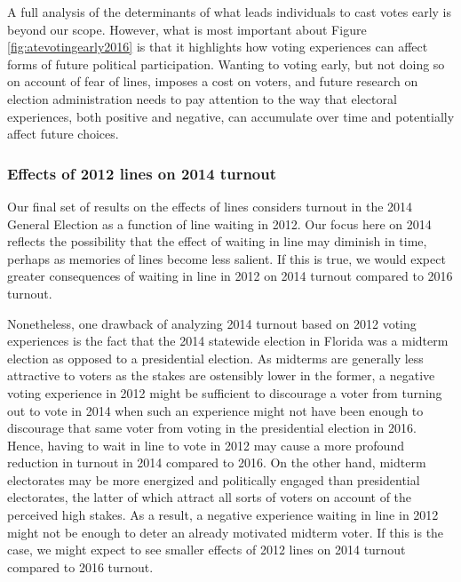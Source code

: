 \documentclass[12pt,titlepage]{article}
\begin{document}

A full analysis of the determinants of what leads individuals to cast
votes early is beyond our scope.  However, what is most important
about Figure \ref{fig:atevotingearly2016} is that it highlights how
voting experiences can affect forms of future political participation.
Wanting to voting early, but not doing so on account of fear of lines,
imposes a cost on voters, and future research on election
administration needs to pay attention to the way that electoral
experiences, both positive and negative, can accumulate over time and
potentially affect future choices.

\subsubsection*{Effects of 2012 lines on 2014 turnout}

Our final set of results on the effects of lines considers turnout in
the 2014 General Election as a function of line waiting in 2012.  Our
focus here on 2014 reflects the possibility that the effect of waiting
in line may diminish in time, perhaps as memories of lines become less
salient.  If this is true, we would expect greater consequences of
waiting in line in 2012 on 2014 turnout compared to 2016 turnout.

Nonetheless, one drawback of analyzing 2014 turnout based on 2012
voting experiences is the fact that the 2014 statewide election in
Florida was a midterm election as opposed to a presidential election.
As midterms are generally less attractive to voters as the stakes are
ostensibly lower in the former, a negative voting experience in 2012
might be sufficient to discourage a voter from turning out to vote in
2014 when such an experience might not have been enough to discourage
that same voter from voting in the presidential election in 2016.
Hence, having to wait in line to vote in 2012 may cause a more
profound reduction in turnout in 2014 compared to 2016.  On the other
hand, midterm electorates may be more energized and politically
engaged than presidential electorates, the latter of which attract all
sorts of voters on account of the perceived high stakes.  As a result,
a negative experience waiting in line in 2012 might not be enough to
deter an already motivated midterm voter.  If this is the case, we
might expect to see smaller effects of 2012 lines on 2014 turnout
compared to 2016 turnout.
\end{document}
